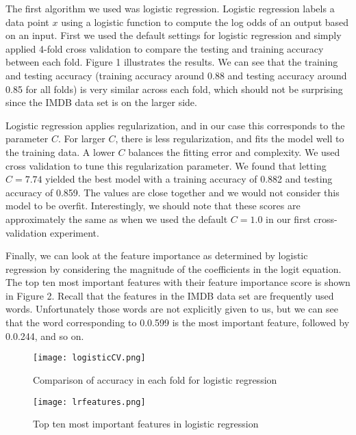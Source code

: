 \documentclass[12pt,letterpaper]{article}
\begin{document}
The first algorithm we used was logistic regression. Logistic regression labels a data point $x$ using a logistic function to compute the log odds of an output based on an input. First we used the default settings for logistic regression and simply applied 4-fold cross validation to compare the testing and training accuracy between each fold. Figure 1 illustrates the results. We can see that the training and testing accuracy (training accuracy around 0.88 and testing accuracy around 0.85 for all folds) is very similar across each fold, which should not be surprising since the IMDB data set is on the larger side.

Logistic regression applies regularization, and in our case this corresponds to the parameter $C$. For larger $C$, there is less regularization, and fits the model well to the training data. A lower $C$ balances the fitting error and complexity. We used cross validation to tune this regularization parameter. We found that letting $C=7.74$ yielded the best model with a training accuracy of 0.882 and testing accuracy of 0.859. The values are close together and we would not consider this model to be overfit. Interestingly, we should note that these scores are approximately the same as when we used the default $C=1.0$ in our first cross-validation experiment.

Finally, we can look at the feature importance as determined by logistic regression by considering the magnitude of the coefficients in the logit equation. The top ten most important features with their feature importance score is shown in Figure 2. Recall that the features in the IMDB data set are frequently used words. Unfortunately those words are not explicitly given to us, but we can see that the word corresponding to 0.0.599 is the most important feature, followed by 0.0.244, and so on.

\begin{figure}[h]
	\centering
	\texttt{[image: logisticCV.png]}
	\caption{Comparison of accuracy in each fold for logistic regression}
\end{figure}

\begin{figure}[h]
	\centering
	\texttt{[image: lrfeatures.png]}
	\caption{Top ten most important features in logistic regression}
\end{figure}
\end{document}
